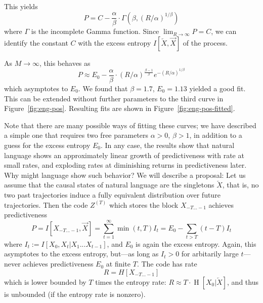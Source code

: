 \documentclass[11pt,letterpaper]{article}
\newif \ifcomment
\newcommand\rljf[1]{\ifcomment{{\color{blue}(#1)}}\else{}\fi}
\begin{document}
This yields
\begin{equation}
	P = C - \frac{\alpha}{\beta} \cdot \Gamma\left(\beta, (R/\alpha)^{1/\beta}\right)
\end{equation}
where $\Gamma$ is the incomplete Gamma function.
Since $\lim_{R \rightarrow \infty} P = C$, we can identify the constant $C$ with the excess entropy $I[\overleftarrow{X}, \overrightarrow{X}]$ of the process.

As $M \rightarrow \infty$, this behaves as
\begin{equation}
	P \approx E_0 - \frac{\alpha}{\beta} \cdot (R/\alpha)^{\frac{\beta-1}{\beta}} e^{-(R/\alpha)^{1/\beta}}
\end{equation}
which asymptotes to $E_0$.
We found that $\beta = 1.7$, $E_0 = 1.13$ yielded a good fit.
This can be extended without further parameters to the third curve in Figure~\ref{fig:eng-pos}.
Resulting fits are shown in Figure~\ref{fig:eng-pos-fitted}.

Note that there are many possible ways of fitting these curves; we have described a simple one that requires two free parameters $\alpha >0$, $\beta > 1$, in addition to a guess for the excess entropy $E_0$.
In any case, the results show that natural language shows an approximately linear growth of predictiveness with rate at small rates, and exploding rates at diminishing returns in predictiveness later.
Why might language show such behavior?
We will describe a proposal:
Let us assume that the causal states of natural language are the singletons $\overleftarrow{X}$, that is, no two past trajectories induce a fully equivalent distribution over future trajectories.
Then the code $Z^{(T)}$ which stores the block $X_{-T...-1}$ achieves predictiveness \rljf{Write out what the min is doing logically: when $t$ exceeds $T$ we multiply only by $T$ (I'm not sure why). Also maybe subscript $P_T$}
\begin{equation}
	P =	I[X_{-T...-1}, \overrightarrow{X}] = \sum_{t=1}^\infty \min(t,T) I_t = E_0 - \sum_{t > T} (t-T) I_t
\end{equation}
where $I_t := I[X_0, X_t | X_1 ... X_{t-1}]$, and $E_0$ is again the excess entropy.
Again, this asymptotes to the excess entropy, but---as long as $I_t > 0$ for arbitarily large $t$---never achieves predictiveness $E_0$ at finite $T$.
The code has rate
\begin{equation}
	R =	H[X_{-T...-1}]
\end{equation}
which is lower bounded by $T$ times the entropy rate: $R \approx T \cdot \operatorname{H}[X_0|\overleftarrow{X}]$, and thus is unbounded (if the entropy rate is nonzero). \rljf{A few cites on previous work arguing about whether natural language has nonzero entropy rate. A conference paper by Ryosuke Takahira has a lit review}
\end{document}
